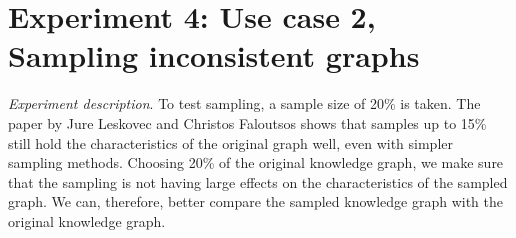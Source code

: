 \documentclass[11pt,letterpaper ,oneside ]{book}
\begin{document}
	\section{Experiment 4: Use case 2, Sampling inconsistent graphs} 
	\begin{table}[!t]
		\centering
		\caption{table showing several statistics about graphs.}
		\label{table:GraphStatsSample}
	\end{table}
	\textit{Experiment description}. To test sampling, a sample size of 20\% is taken. The paper by Jure Leskovec and Christos Faloutsos \cite{Leskovec:2006} shows that samples up to 15\% still hold the characteristics of the original graph well, even with simpler sampling methods. Choosing 20\% of the original knowledge graph, we make sure that the sampling is not having large effects on the characteristics of the sampled graph. We can, therefore, better compare the sampled knowledge graph with the original knowledge graph. \\
	
	
\begin{figure}[t]
	
\end{figure}
	
\end{document}

